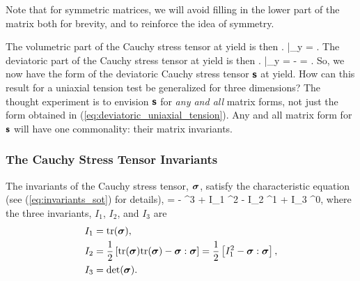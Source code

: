 {\begin{Hremark}
Note that for symmetric matrices, we will 
avoid filling in the lower part of the matrix both for brevity, and to
reinforce the idea of symmetry.
\end{Hremark}

The volumetric part of the Cauchy stress tensor at yield is then
\be
\left.
\vsigmavol 
\right|_y
= 
.
\ee
The deviatoric part of the Cauchy stress tensor at yield is then
\be
\left.
\tsbold 
\right|_y
= 
 - 
 = 
.
\label{eq:deviatoric_uniaxial_tension}
\ee
So, we now have the form of the deviatoric Cauchy stress
tensor $\mbox{\sffamily\bfseries s}$ at yield.  How can this result for a uniaxial tension test
be generalized for three dimensions?  The thought experiment is to
envision $\mbox{\sffamily\bfseries s}$ for {\em any and all} matrix forms, not just the form
obtained in (\ref{eq:deviatoric_uniaxial_tension}).  Any and all matrix
form for $\mbox{\sffamily\bfseries s}$ will have one commonality:  their matrix invariants.

\subsubsection{The Cauchy Stress Tensor Invariants}
The invariants of the Cauchy stress tensor, $\mbox{\boldmath $\sigma$}$, satisfy the
characteristic equation (see (\ref{eq:invariants_sot}) for details),
 = - \lambda^3 + I_1 \lambda^2 - I_2 \lambda^1 + I_3 \lambda^0,
\ee
where the three invariants, $I_1$, $I_2$, and $I_3$ are 
\begin{align}
 I_1 &= \mbox{tr}(\mbox{\boldmath $\sigma$}), \\
 I_2 &= \frac{1}{2}\left[ \mbox{tr}(\mbox{\boldmath $\sigma$}) \mbox{tr}(\mbox{\boldmath $\sigma$}) 
        - \mbox{\boldmath $\sigma$} : \mbox{\boldmath $\sigma$} \right] 
	 = \frac{1}{2}\left[I^2_1 - \mbox{\boldmath $\sigma$} : \mbox{\boldmath $\sigma$} \right], \\
 I_3 &= \det(\mbox{\boldmath $\sigma$}).
\end{align}

}
